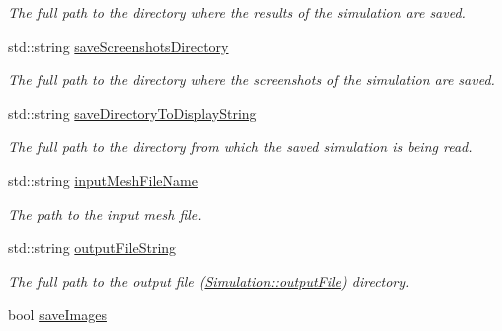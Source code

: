 \begin{DoxyCompactItemize}
\begin{DoxyCompactList}\small\item\em The full path to the directory where the results of the simulation are saved. \end{DoxyCompactList}\item 
\hypertarget{classSimulation_a29eff6bb523b42f0c5e9db833a094444}{}std\+::string \hyperlink{classSimulation_a29eff6bb523b42f0c5e9db833a094444}{save\+Screenshots\+Directory}\label{classSimulation_a29eff6bb523b42f0c5e9db833a094444}

\begin{DoxyCompactList}\small\item\em The full path to the directory where the screenshots of the simulation are saved. \end{DoxyCompactList}\item 
\hypertarget{classSimulation_a3b086632fb67338d29f2ddc69c9087be}{}std\+::string \hyperlink{classSimulation_a3b086632fb67338d29f2ddc69c9087be}{save\+Directory\+To\+Display\+String}\label{classSimulation_a3b086632fb67338d29f2ddc69c9087be}

\begin{DoxyCompactList}\small\item\em The full path to the directory from which the saved simulation is being read. \end{DoxyCompactList}\item 
\hypertarget{classSimulation_a419351054778337026abd0bc0787019d}{}std\+::string \hyperlink{classSimulation_a419351054778337026abd0bc0787019d}{input\+Mesh\+File\+Name}\label{classSimulation_a419351054778337026abd0bc0787019d}

\begin{DoxyCompactList}\small\item\em The path to the input mesh file. \end{DoxyCompactList}\item 
\hypertarget{classSimulation_ab911b1546aecf4b891f670f11ebccf19}{}std\+::string \hyperlink{classSimulation_ab911b1546aecf4b891f670f11ebccf19}{output\+File\+String}\label{classSimulation_ab911b1546aecf4b891f670f11ebccf19}

\begin{DoxyCompactList}\small\item\em The full path to the output file (\hyperlink{classSimulation_a473866f52cbbb0f5186f4b2a4ac451ee}{Simulation\+::output\+File}) directory. \end{DoxyCompactList}\item 
\hypertarget{classSimulation_afb8b3f2ba1e2d02eec79d83cbd6b4d16}{}bool \hyperlink{classSimulation_afb8b3f2ba1e2d02eec79d83cbd6b4d16}{save\+Images}\label{classSimulation_afb8b3f2ba1e2d02eec79d83cbd6b4d16}


\end{DoxyCompactItemize}
